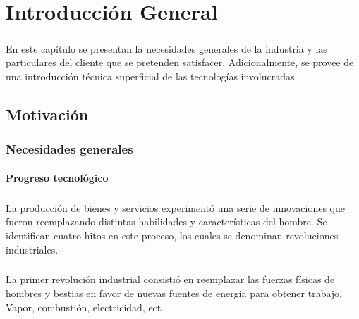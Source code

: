 \chapter{Introducción General}

\label{Chapter1} %
\label{IntroGeneral}


\newcommand{\keyword}[1]{\textbf{#1}}
\newcommand{\tabhead}[1]{\textbf{#1}}
\newcommand{\code}[1]{\texttt{#1}}
\newcommand{\file}[1]{\texttt{\bfseries#1}}
\newcommand{\option}[1]{\texttt{\itshape#1}}
\newcommand{\grados}{$^{\circ}$}


\paragraph{} En este capítulo se presentan la necesidades generales de la industria y las particulares del cliente que se pretenden satisfacer. Adicionalmente, se provee de una introducción técnica superficial de las tecnologías involucradas.

\section{Motivación}
\label{motivacion}

\subsection{Necesidades generales}

	\subsubsection{Progreso tecnológico}

	\paragraph{} La producción de bienes y servicios experimentó una serie de innovaciones que fueron reemplazando distintas habilidades y características del hombre. Se identifican cuatro hitos en este proceso, los cuales se denominan revoluciones industriales.
	\paragraph{} La primer revolución industrial consistió en reemplazar las fuerzas físicas de hombres y bestias en favor de nuevas fuentes de energía para obtener trabajo. Vapor, combustión, electricidad, ect. 
